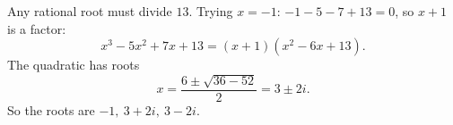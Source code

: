 Any rational root must divide $13$. Trying $x=-1$: $-1-5-7+13=0$, so $x+1$ is a factor:
\[x^3-5x^2+7x+13=(x+1)\left(x^2-6x+13\right).\]
The quadratic has roots
\[x=\dfrac{6\pm\sqrt{36-52}}{2}=3\pm2i.\]
So the roots are $\boxed{-1,\ 3+2i,\ 3-2i}$.
